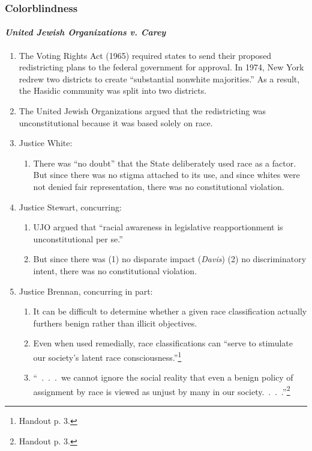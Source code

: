 \subsubsection{Colorblindness}

\paragraph{\emph{United Jewish Organizations v. Carey}}

\begin{enumerate}
    \item The Voting Rights Act (1965) required states to send their proposed 
    redistricting plans to the federal government for approval. In 1974, New 
    York redrew two districts to create ``substantial nonwhite majorities.'' 
    As a result, the Hasidic community was split into two districts.
    \item The United Jewish Organizations argued that the redistricting was 
    unconstitutional because it was based solely on race.
    \item Justice White:
    \begin{enumerate}
        \item There was ``no doubt'' that the State deliberately used race as 
        a factor. But since there was no stigma attached to its use, and since 
        whites were not denied fair representation, there was no 
        constitutional violation.
    \end{enumerate}
    \item Justice Stewart, concurring:
    \begin{enumerate}
        \item UJO argued that ``racial awareness in legislative 
        reapportionment is unconstitutional per se.''
        \item But since there was (1) no disparate impact (\emph{Davis}) (2) 
        no discriminatory intent, there was no constitutional violation.
    \end{enumerate}
    \item Justice Brennan, concurring in part:
    \begin{enumerate}
        \item It can be difficult to determine whether a given race 
        classification actually furthers benign rather than illicit 
        objectives.
        \item Even when used remedially, race classifications can ``serve to 
        stimulate our society's latent race consciousness.''\footnote{Handout 
        p. 3.}
        \item ``~.~.~.~we cannot ignore the social reality that even a benign 
        policy of assignment by race is viewed as unjust by many in our 
        society.~.~.~.''\footnote{Handout p. 3.}
    \end{enumerate}
\end{enumerate}

